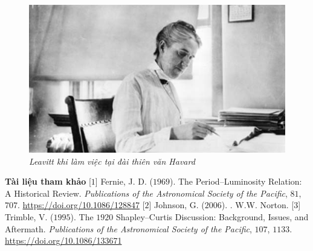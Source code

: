 \begin{multicols}{2}
\begin{figure}[H]
		\vspace*{-5pt}
		\centering
		\captionsetup{labelformat= empty, justification=centering}
		\includegraphics[width= 1\linewidth]{12}
		\caption{\small\textit{\color{timhieukhoahoc}Leavitt khi làm việc tại đài thiên văn Havard}}
		\vspace*{-10pt}
	\end{figure}
	\textbf{\color{timhieukhoahoc}Tài liệu tham khảo}
	\vskip 0.1cm
	[$1$] Fernie, J. D. ($1969$). The Period--Luminosity Relation: A Historical Review. \textit{Publications of the Astronomical Society of the Pacific}, $81$, $707$. \url{https://doi.org/10.1086/128847}
	\vskip 0.1cm
	[$2$] Johnson, G. ($2006$).  . W.W. Norton.
	\vskip 0.1cm
	[$3$] Trimble, V. ($1995$). The $1920$ Shapley--Curtis Discussion: Background, Issues, and Aftermath. \textit{Publications of the Astronomical Society of the Pacific}, $107$, $1133$. \url{https://doi.org/10.1086/133671}
\end{multicols}


